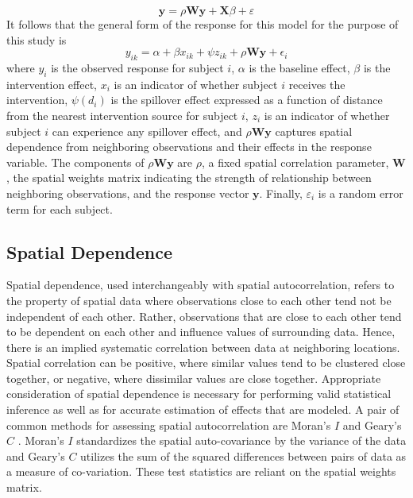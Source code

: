 \documentclass{article}[11pt]
\begin{document}
\begin{equation}
    \mathbf{y} = \rho\mathbf{Wy}+\mathbf{X}\beta + \varepsilon
\end{equation}
It follows that the general form of the response for this model for the purpose of this study is
\begin{equation}
    y_{ik} = \alpha + \beta x_{ik} + \psi z_{ik} + \rho\mathbf{Wy} + \epsilon_i
\end{equation}
where $y_i$ is the observed response for subject $i$, $\alpha$ is the baseline effect, $\beta$ is the intervention effect, $x_i$ is an indicator of whether subject $i$ receives the intervention, $\psi(d_i)$ is the spillover effect expressed as a function of distance from the nearest intervention source for subject $i$, $z_i$ is an indicator of whether subject $i$ can experience any spillover effect, and $\rho\mathbf{Wy}$ captures spatial dependence from neighboring observations and their effects in the response variable. The components of $\rho\mathbf{Wy}$ are $\rho$, a fixed spatial correlation parameter, $\mathbf{W}$, the spatial weights matrix indicating the strength of relationship between neighboring observations, and the response vector $\mathbf{y}$. Finally, $\varepsilon_i$ is a random error term for each subject.

\subsection{Spatial Dependence}\label{section:SpatialWeightsMatrix}

Spatial dependence, used interchangeably with spatial autocorrelation, refers to the property of spatial data where observations close to each other tend not be independent of each other. Rather, observations that are close to each other tend to be dependent on each other and influence values of surrounding data. Hence, there is an implied systematic correlation between data at neighboring locations. Spatial correlation can be positive, where similar values tend to be clustered close together, or negative, where dissimilar values are close together. Appropriate consideration of spatial dependence is necessary for performing valid statistical inference as well as for accurate estimation of effects that are modeled. A pair of common methods for assessing spatial autocorrelation are Moran's $\textit{I}$ \cite{moran_interpretation_1948}\cite{moran_notes_1950} and Geary's $\textit{C}$ \cite{geary_contiguity_1954}\cite{waller_applied_2004}. Moran's $\textit{I}$ standardizes the spatial auto-covariance by the variance of the data and Geary's $\textit{C}$ utilizes the sum of the squared differences between pairs of data as a measure of co-variation. These test statistics are reliant on the spatial weights matrix.
\end{document}
